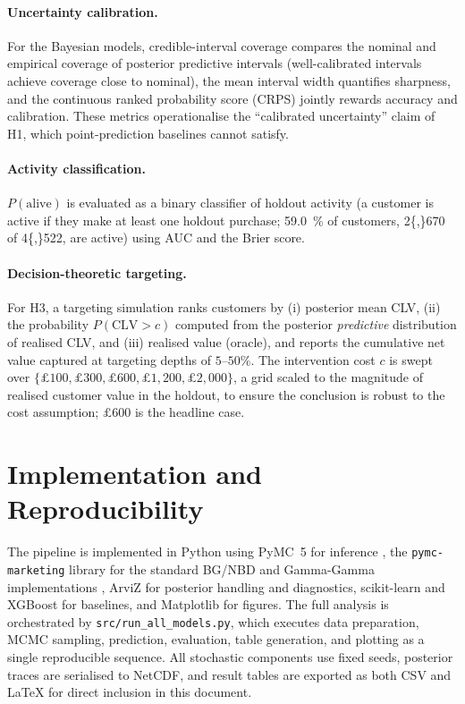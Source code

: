 \paragraph{Uncertainty calibration.}
For the Bayesian models, credible-interval coverage compares the nominal and empirical coverage of posterior predictive intervals (well-calibrated intervals achieve coverage close to nominal), the mean interval width quantifies sharpness, and the continuous ranked probability score (CRPS) jointly rewards accuracy and calibration. These metrics operationalise the ``calibrated uncertainty'' claim of H1, which point-prediction baselines cannot satisfy.

\paragraph{Activity classification.}
$P(\text{alive})$ is evaluated as a binary classifier of holdout activity (a customer is active if they make at least one holdout purchase; \SI{59.0}{\percent} of customers, \num{2{,}670} of \num{4{,}522}, are active) using AUC and the Brier score.

\paragraph{Decision-theoretic targeting.}
For H3, a targeting simulation ranks customers by (i) posterior mean CLV, (ii) the probability $P(\text{CLV} > c)$ computed from the posterior \emph{predictive} distribution of realised CLV, and (iii) realised value (oracle), and reports the cumulative net value captured at targeting depths of $5$--$50\%$. The intervention cost $c$ is swept over $\{\pounds 100, \pounds 300, \pounds 600, \pounds 1{,}200, \pounds 2{,}000\}$, a grid scaled to the magnitude of realised customer value in the holdout, to ensure the conclusion is robust to the cost assumption; $\pounds 600$ is the headline case.

\section{Implementation and Reproducibility}
\label{sec:implementation}

The pipeline is implemented in Python using PyMC~5 for inference \parencite{salvatier2016}, the \texttt{pymc-marketing} library for the standard BG/NBD and Gamma-Gamma implementations \parencite{pymcmarketing2024}, ArviZ for posterior handling and diagnostics, scikit-learn and XGBoost for baselines, and Matplotlib for figures. The full analysis is orchestrated by \texttt{src/\allowbreak run\_all\_models.py}, which executes data preparation, MCMC sampling, prediction, evaluation, table generation, and plotting as a single reproducible sequence. All stochastic components use fixed seeds, posterior traces are serialised to NetCDF, and result tables are exported as both CSV and \LaTeX{} for direct inclusion in this document.
